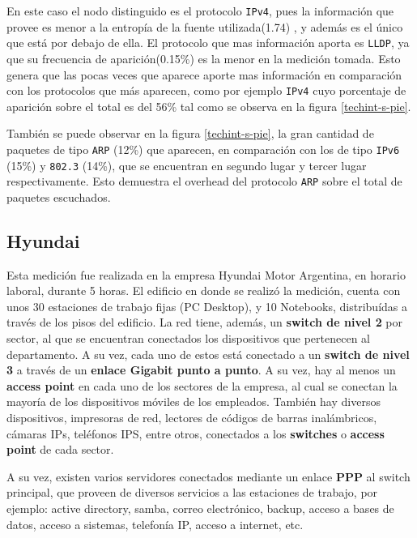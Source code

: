 \documentclass[final,inline,a4paper,narroweqnarray]{ieee}
\begin{document}
    En este caso el nodo distinguido es el protocolo \texttt{IPv4},
    pues la información que provee es menor a la entropía de la fuente
    utilizada(1.74) , y además es el único que está por debajo de
    ella. El protocolo que mas información aporta es \texttt{LLDP}, ya
    que su frecuencia de aparición(0.15\%) es la menor en la medición
    tomada. Esto genera que las pocas veces que aparece aporte mas
    información en comparación con los protocolos que más aparecen,
    como por ejemplo
    \texttt{IPv4} cuyo porcentaje de aparición sobre el total es del 56\%
    tal como se observa en la figura \ref{techint-s-pie}.

    También se puede observar en la figura \ref{techint-s-pie}, la
    gran cantidad de paquetes de tipo \texttt{ARP} (12\%) que
    aparecen, en comparación con los de tipo \texttt{IPv6} (15\%) y
    \texttt{802.3} (14\%), que se encuentran en segundo lugar y tercer
    lugar respectivamente. Esto demuestra el overhead del protocolo
    \texttt{ARP} sobre el total de paquetes escuchados.

  \subsection{Hyundai}

    Esta medición fue realizada en la empresa Hyundai Motor Argentina,
    en horario laboral, durante 5 horas. El edificio en donde se
    realizó la medición, cuenta con unos 30 estaciones de trabajo
    fijas (PC Desktop), y 10 Notebooks, distribuídas a través de los
    pisos del edificio. La red tiene, además, un \textbf{switch de
    nivel 2} por sector, al que se encuentran conectados los
    dispositivos que pertenecen al departamento. A su vez, cada uno de
    estos está conectado a un \textbf{switch de nivel 3} a través de
    un \textbf{enlace Gigabit punto a punto}. A su vez, hay al menos
    un \textbf{access point} en cada uno de los sectores de la
    empresa, al cual se conectan la mayoría de los dispositivos
    móviles de los empleados. También hay diversos dispositivos,
    impresoras de red, lectores de códigos de barras inalámbricos,
    cámaras IPs, teléfonos IPS, entre otros, conectados a los
    \textbf{switches} o \textbf{access point} de cada sector.

    A su vez, existen varios servidores conectados mediante un enlace
    \textbf{PPP} al switch principal, que proveen de diversos servicios a las
    estaciones de trabajo, por ejemplo: active directory, samba,
    correo electrónico, backup, acceso a bases de datos, acceso a
    sistemas, telefonía IP, acceso a internet, etc.
\end{document}
